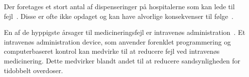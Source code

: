Der foretages et stort antal af dispenseringer på hospitalerne som kan lede til fejl~\citep{Agrawal2009}. Disse er ofte ikke opdaget og kan have alvorlige konsekvenser til følge~\citep{Simpson2008}.

En af de hyppigste årsager til medicineringsfejl er intravenøs administration~\citep{Kaushal2002}. Et intravenøs administration device, som anvender forenklet programmering og computerbaseret kontrol kan medvirke til at reducere fejl ved intravenøs medicinering. Dette medvirker blandt andet til at reducere sandsynligheden for tidobbelt overdoser.~\citep{Kaushal2002}


